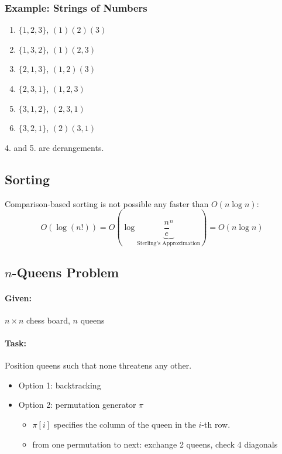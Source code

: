 \documentclass[11pt]{article}
\begin{document}

\subsubsection{Example: Strings of Numbers}

\begin{enumerate}
\item $ \{ 1, 2, 3 \}$, $ (1) (2) (3) $
\item $ \{ 1, 3, 2 \} $, $ (1) (2, 3) $
\item $\{ 2, 1, 3 \} $, $ (1, 2) (3) $
\item $\{ 2, 3, 1 \} $, $ (1, 2, 3) $
\item $\{ 3, 1, 2 \} $, $ (2, 3, 1) $
\item $\{ 3, 2, 1 \} $, $ (2) (3, 1) $
\end{enumerate}

4. and 5. are derangements.

\subsection{Sorting}

Comparison-based sorting is not possible any faster than $ O(n \log n) $:
\[ O(\log(n!)) = O(\log \underbrace{\frac{n}{e}^n}_{\text{Sterling's Approximation}}) = O(n \log n) \]

\subsection{$ n $-Queens Problem}

\paragraph{Given:} $ n \times n $ chess board, $ n $ queens

\paragraph{Task:} Position queens such that none threatens any other.

\begin{itemize}
\item Option 1: backtracking
\item Option 2: permutation generator $ \pi $
	\begin{itemize}
	\item $ \pi[i] $ specifies the column of the queen in the $ i $-th row.
	\item from one permutation to next: exchange 2 queens, check 4 diagonals
	\end{itemize}
\end{itemize}
\end{document}
